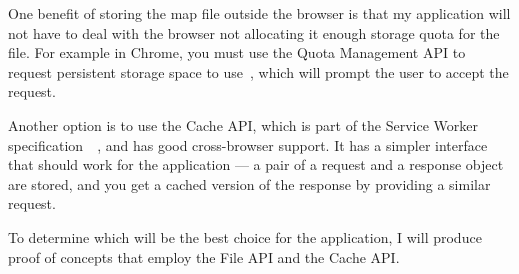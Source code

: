 One benefit of storing the map file outside the browser is that my application will not have to deal with the browser not allocating it enough storage quota for the file. For example in Chrome, you must use the Quota Management API to request persistent storage space to use~\cite{gd-offline-html5-storage}, which will prompt the user to accept the request.

Another option is to use the Cache API, which is part of the Service Worker specification~\cite{w3c-service-workers-caches}~\cite{mdn-service-workers}, and has good cross-browser support. It has a simpler interface that should work for the application --- a pair of a request and a response object are stored, and you get a cached version of the response by providing a similar request. 

To determine which will be the best choice for the application, I will produce proof of concepts that employ the File API and the Cache API\@.
